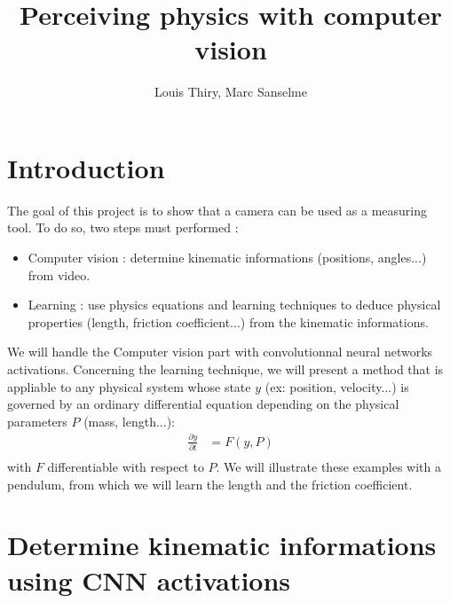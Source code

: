 \documentclass[11pt, oneside]{amsart}
\title{Perceiving physics with computer vision}
\author{Louis Thiry, Marc Sanselme}
\begin{document}
\maketitle

\section*{Introduction}

The goal of this project is to show that a camera can be used as a measuring tool.
To do so, two steps must performed :
\begin{itemize}
  \item Computer vision : determine kinematic informations (positions, angles...) from video.
  \item Learning : use physics equations and learning techniques to deduce physical properties (length, friction coefficient...) from the kinematic informations.
\end{itemize}
We will handle the Computer vision part with convolutionnal neural networks activations.
Concerning the learning technique, we will present a method that is appliable to any physical system whose state $y$ (ex: position, velocity...) is governed by an ordinary differential equation depending on the physical parameters $P$ (mass, length...):
\begin{align*}
  \frac{\partial y}{\partial t} &= F(y, P)\\
\end{align*}
with $F$ differentiable with respect to $P$.
We will illustrate these examples with a pendulum, from which we will learn the length and the friction coefficient.

\section{Determine kinematic informations using CNN activations}
\end{document}
